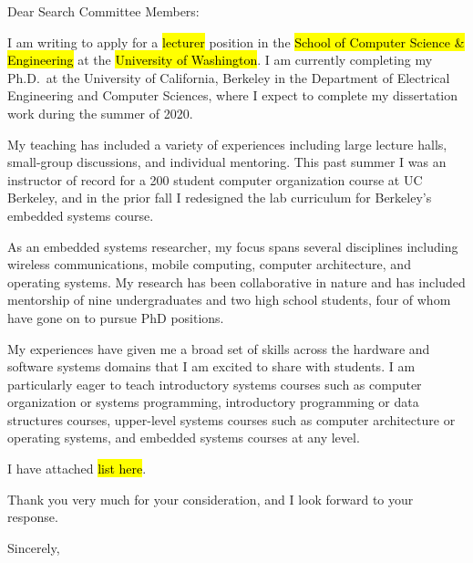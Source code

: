 \documentclass{letter}
\begin{document}
\begin{letter}{}
\date{}

\opening{Dear Search Committee Members:}

I am writing to apply for a
\hl{lecturer}
position in the
\hl{School of Computer Science \& Engineering}
at the
\hl{University of Washington}.
%
I am currently completing my Ph.D.\ at the University of California, Berkeley
in the Department of Electrical Engineering and Computer Sciences, where I
expect to complete my dissertation work during the summer of 2020.

My teaching has included a variety of experiences including
large lecture halls, small-group discussions, and individual mentoring.
%
This past summer I was an instructor of record for a 200 student computer
organization course at UC Berkeley, and in the prior fall I redesigned the lab
curriculum for Berkeley's embedded systems course.

As an embedded systems researcher, my focus spans several disciplines including
wireless communications, mobile computing, computer architecture, and operating
systems.
%
My research has been collaborative in nature and has included mentorship of
nine undergraduates and two high school students, four of whom have gone on to
pursue PhD positions.

My experiences have given me a broad set of skills across the hardware and
software systems domains that I am excited to share with students.
%
I am particularly eager to teach
introductory systems courses such as computer organization or systems programming,
introductory programming or data structures courses,
upper-level systems courses such as computer architecture or operating systems,
and embedded systems courses at any level.
%


I have attached
\hl{list here}.

Thank you very much for your consideration, and I look forward to your response.

\closing{Sincerely,}

\end{letter}
\end{document}
